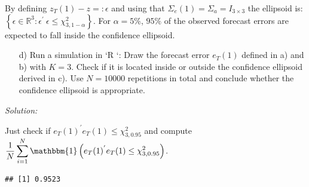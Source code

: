 \documentclass[12pt,a4paper]{article}
\newenvironment{Shaded}{\begin{snugshade}}{\end{snugshade}}
\newcommand{\CommentTok}[1]{\textcolor[rgb]{0.56,0.35,0.01}{\textit{#1}}}
\newcommand{\DataTypeTok}[1]{\textcolor[rgb]{0.13,0.29,0.53}{#1}}
\newcommand{\DecValTok}[1]{\textcolor[rgb]{0.00,0.00,0.81}{#1}}
\newcommand{\FloatTok}[1]{\textcolor[rgb]{0.00,0.00,0.81}{#1}}
\newcommand{\KeywordTok}[1]{\textcolor[rgb]{0.13,0.29,0.53}{\textbf{#1}}}
\newcommand{\NormalTok}[1]{#1}
\newcommand{\OperatorTok}[1]{\textcolor[rgb]{0.81,0.36,0.00}{\textbf{#1}}}
\newcommand{\OtherTok}[1]{\textcolor[rgb]{0.56,0.35,0.01}{#1}}
\newcommand{\StringTok}[1]{\textcolor[rgb]{0.31,0.60,0.02}{#1}}
\begin{document}
By defining \(z_T (1) - z =: \epsilon\) and using that
\(\Sigma_e (1) = \Sigma_a = I_{3 \times 3}\) the ellipsoid is:
\(\left\{ \epsilon \in \mathbb{R}^{3}: \epsilon^{'} \ \epsilon \leq \chi_{3, 1- \alpha}^{2}\right\}\).
For \(\alpha = 5 \%\), \(95 \%\) of the observed forecast errors are
expected to fall inside the confidence ellipsoid.

\begin{itemize}
  \item[d)] Run a simulation in `R `: Draw the forecast error $e_T (1)$ defined in a) and b) with $K = 3$. Check if it is located inside or outside the confidence ellipsoid derived in c). Use $N = 10 000$ repetitions in total and conclude whether the confidence ellipsoid is appropriate.  
\end{itemize}

\emph{Solution:}

Just check if \(e_T (1)^{'} e_T (1) \leq \chi_{3, 0.95}^{2}\) and
compute
\(\displaystyle \dfrac{1}{N} \sum_{i = 1}^{N} \mathbbm{1} \left( e_T (1)^{'} e_T (1) \leq \chi_{3, 0.95}^{2}\right)\).

\begin{Shaded}
\end{Shaded}

\begin{verbatim}
## [1] 0.9523
\end{verbatim}
\end{document}
